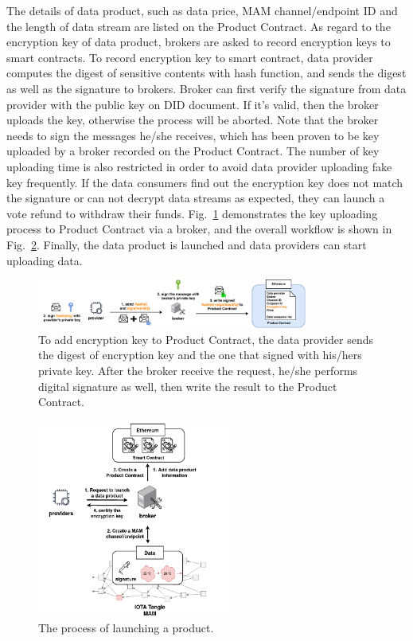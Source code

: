 \documentclass[conference]{IEEEtran}
\begin{document}
The details of data product, such as data price, MAM channel/endpoint ID and the length of data stream are listed on the Product Contract. As regard to the encryption key of data product, brokers are asked to  record encryption keys to smart contracts. To record encryption key to smart contract, data provider computes the digest of sensitive contents with hash function, and sends the digest as well as the signature to brokers. Broker can first verify the signature from data provider with the public key on DID document. If it's valid, then the broker uploads the key, otherwise the process will be aborted. Note that the broker needs to sign the messages he/she receives, which has been proven to be key uploaded by a broker recorded on the Product Contract. The number of key uploading time is also restricted in order to avoid data provider uploading fake key frequently. If the data consumers find out the encryption key does not match the signature or can not decrypt data streams as expected, they can launch a vote refund to withdraw their funds. Fig.~\ref{fig:key_upload} demonstrates the key uploading process to Product Contract via a broker, and the overall workflow is shown in Fig.~\ref{fig:launching_product}. Finally, the data product is launched and data providers can start uploading data.
\begin{figure}[h]
    \centering
    \includegraphics[width=3.5in]{key_upload}
    \caption{To add encryption key to Product Contract, the data provider sends the digest of encryption key and the one that signed with his/hers private key. After the broker receive the request, he/she performs digital signature as well, then write the result to the Product Contract.}
    \label{fig:key_upload}
\end{figure}

\begin{figure}[!t]
    \centering
    \includegraphics[width=2.5in]{launching_product}
    \caption{The process of launching a product.}
    \label{fig:launching_product}
\end{figure}
\end{document}
